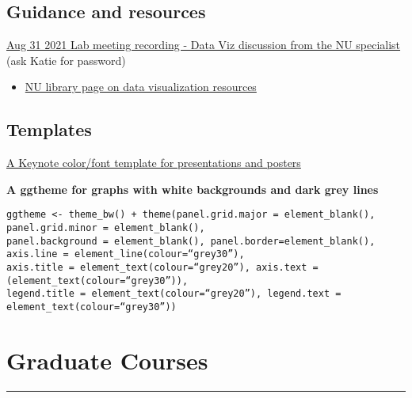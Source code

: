 \documentclass[
  letterpaper,
  DIV=11,
  numbers=noendperiod]{scrreprt}
\providecommand{\tightlist}{%
  \setlength{\itemsep}{0pt}\setlength{\parskip}{0pt}}\usepackage{longtable,booktabs,array}
\begin{document}
\hypertarget{guidance-and-resources}{%
\section*{\texorpdfstring{\textbf{Guidance and
resources}}{Guidance and resources}}\label{guidance-and-resources}}

\href{https://northeastern.zoom.us/rec/share/L4GY5DKi6XCi1nf8_RxkzyGyu6NAojZd4nsNsL1WpxiEfNp5qe_PHd5An9ngPANS.49r97rNHCjo5PNSH}{Aug
31 2021 Lab meeting recording - Data Viz discussion from the NU
specialist} (ask Katie for password)

\begin{itemize}
\tightlist
\item
  \href{https://subjectguides.lib.neu.edu/dataviz/tutorials}{NU library
  page on data visualization resources}
\end{itemize}

\hypertarget{templates}{%
\section*{\texorpdfstring{\textbf{Templates}}{Templates}}\label{templates}}

\href{https://github.com/DrK-Lo/lotterhoslabprotocols/raw/gh-pages/ClassicPresentationTheme.key}{A
Keynote color/font template for presentations and posters}

\textbf{A ggtheme for graphs with white backgrounds and dark grey lines}

\begin{verbatim}
ggtheme <- theme_bw() + theme(panel.grid.major = element_blank(), panel.grid.minor = element_blank(), 
panel.background = element_blank(), panel.border=element_blank(), axis.line = element_line(colour=“grey30”), 
axis.title = element_text(colour=“grey20”), axis.text = (element_text(colour=“grey30”)), 
legend.title = element_text(colour=“grey20”), legend.text = element_text(colour=“grey30”))
\end{verbatim}

\hypertarget{graduate-courses}{%
\chapter{Graduate Courses}\label{graduate-courses}}

\begin{center}\rule{0.5\linewidth}{0.5pt}\end{center}
\end{document}

